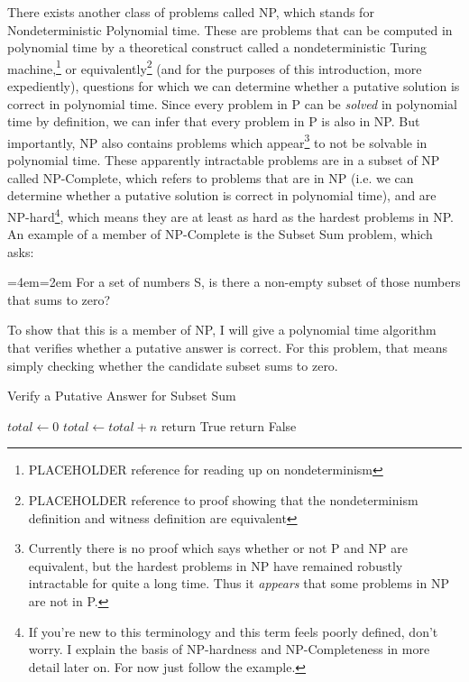 \documentclass[12pt,twoside]{reedthesis}
\newenvironment{blockquote}{%
  \par%
  \medskip
  \leftskip=4em\rightskip=2em%
  \noindent\ignorespaces}{%
  \par\medskip}
\begin{document}
There exists another class of problems called NP, which stands for Nondeterministic Polynomial time. These are problems that can be computed in polynomial time by a theoretical construct called a nondeterministic Turing machine,\footnote{PLACEHOLDER reference for reading up on nondeterminism} or equivalently\footnote{PLACEHOLDER reference to proof showing that the nondeterminism definition and witness definition are equivalent} (and for the purposes of this introduction, more expediently), questions for which we can determine whether a putative solution is correct in polynomial time. Since every problem in P can be \textit{solved} in polynomial time by definition, we can infer that every problem in P is also in NP. But importantly, NP also contains problems which appear\footnote{Currently there is no proof which says whether or not P and NP are equivalent, but the hardest problems in NP have remained robustly intractable for quite a long time. Thus it \textit{appears} that some problems in NP are not in P.} to not be solvable in polynomial time. These apparently intractable problems are in a subset of NP called NP-Complete, which refers to problems that are in NP (i.e. we can determine whether a putative solution is correct in polynomial time), and are NP-hard\footnote{If you're new to this terminology and this term feels poorly defined, don't worry. I explain the basis of NP-hardness and NP-Completeness in more detail later on. For now just follow the example.}, which means they are at least as hard as the hardest problems in NP. An example of a member of NP-Complete is the Subset Sum problem, which asks:
\begin{blockquote}
For a set of numbers S, is there a non-empty subset of those numbers that sums to zero?
\end{blockquote}
To show that this is a member of NP, I will give a polynomial time algorithm that verifies whether a putative answer is correct. For this problem, that means simply checking whether the candidate subset sums to zero.

\begin{algorithm}
\caption{Verify a Putative Answer for Subset Sum}
\begin{algorithmic}
\State $total \gets 0$
\State $total \gets total + n$
\EndFor
{}
\State return True
\Else
\State return False
\EndIf
\end{algorithmic}
\end{algorithm}
\end{document}
